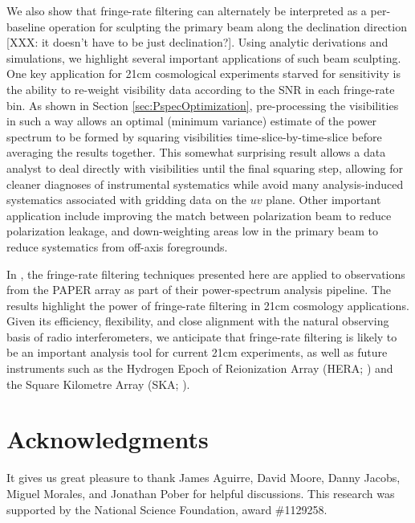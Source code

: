 \documentclass[twocolumn,apj,numberedappendix]{emulateapj}
\begin{document}
We also show that fringe-rate filtering can alternately be interpreted as a per-baseline
operation for sculpting the primary beam along the declination direction [XXX: it doesn't have to be
just declination?].  Using analytic
derivations and simulations, we highlight several important applications of such beam
sculpting.  One key application for 21cm cosmological experiments starved for sensitivity
is the ability to re-weight visibility data according to the SNR in each fringe-rate bin.
As shown in Section \ref{sec:PspecOptimization}, pre-processing the visibilities in such a way
allows an optimal (minimum variance) estimate of the power spectrum to be formed by
squaring visibilities time-slice-by-time-slice before averaging the results together. This
somewhat surprising result allows a data analyst to deal directly with visibilities until
the final squaring step, allowing for cleaner diagnoses of instrumental systematics while
avoid many analysis-induced systematics associated with gridding data on the $uv$ plane.
%
Other important application include improving the match between polarization beam to
reduce polarization leakage, and down-weighting areas low in the primary beam
to reduce systematics from off-axis foregrounds.

In \citet{ali_et_al2015}, the fringe-rate filtering techniques presented here are applied to
observations from the PAPER array as part of their power-spectrum analysis pipeline.  The
results highlight the power of fringe-rate filtering in 21cm cosmology applications.
Given its efficiency, flexibility, and close alignment with the natural observing
basis of radio interferometers, we anticipate that fringe-rate filtering is likely to be
an important analysis tool for current 21cm experiments, as well as future instruments
such as the Hydrogen Epoch of Reionization Array (HERA; \citealt{pober_et_al2014}) and
the Square Kilometre Array (SKA; \citealt{carilli2014}).


\section{Acknowledgments}

It gives us great pleasure to thank James Aguirre, David Moore, Danny Jacobs, 
Miguel Morales, and Jonathan Pober for helpful discussions.  This research
was supported by the National Science Foundation, award \#1129258.




\end{document}
